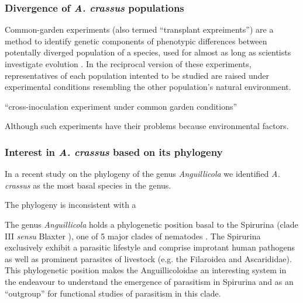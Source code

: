 \subsubsection{Divergence of \textit{A. crassus} populations}
\label{div-ac}

Common-garden experiments (also termed ``transplant expreiments'') are
a method to identify genetic components of phenotypic differences
between potentally diverged population of a species, used for almost
as long as scientists investigate evolution
\cite{kerner_classic_common_garden, bonnier_classic_common_garden}. In
the reciprocal version of these experiments, representatives of each
population intented to be studied are raised under experimental
conditions resembling the other population's natural environment.

 ``cross-inoculation experiment under common garden
conditions'' \cite{kaltz_shykoff_rev}




Although such experiments have their problems because environmental
factors.



\subsubsection{Interest in \textit{A. crassus} based on its
    phylogeny}
\label{phyl-int}
  In a recent study on the phylogeny of the genus
  \textit{Anguillicola} we identified \textit{A. crassus} as the most
  basal species in the genus.

  The phylogeny is inconsistent with a

  The genus \textit{Anguillicola} holds a phylogenetic position basal
  to the Spirurina (clade III \textit{sensu} Blaxter
  \cite{blaxter_molecular_1998}), one of 5 major clades of nematodes
  \cite{nadler_molecular_2007, wijov_evolutionary_2006}. The Spirurina
  exclusively exhibit a parasitic lifestyle and comprise improtant
  human pathogens as well as prominent parasites of livestock
  (e.g. the Filaroidea and Ascarididae). This phylogenetic position
  makes the Anguillicoloidae an interesting system in the endeavour to
  understand the emergence of parasitism in Spirurina and as an
  ``outgroup'' for functional studies of parasitism in this
  clade. 


